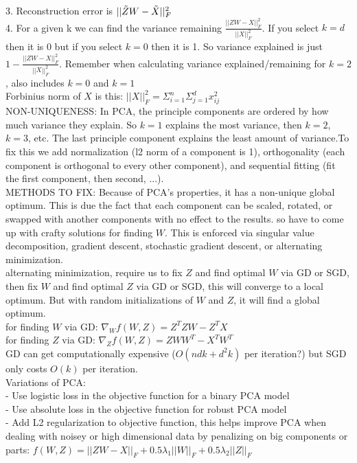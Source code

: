 \documentclass[8pt]{extarticle}
\begin{document}
\begin{multicols*}{2}
3. Reconstruction error is $||\Tilde{Z}W-\Tilde{X}||_F^2$ 
\\
4. For a given k we can find the variance remaining $\frac{||ZW-X||_F^2}{||X||_F^2}$. If you select $k=d$ then it is 0 but if you select $k=0$ then it is 1. So variance explained is just $1-\frac{||ZW-X||_F^2}{||X||_F^2}$. Remember when calculating variance explained/remaining for $k=2$, also includes $k=0$ and $k=1$
\\
Forbinius norm of $X$ is this: $||X||_F^2 = \Sigma_{i=1}^n \Sigma_{j=1}^d x_{ij}^2$
\\
NON-UNIQUENESS: In PCA, the principle components are ordered by how much variance they explain. So $k=1$ explains the most variance, then $k=2$, $k=3$, etc. The last principle component explains the least amount of variance.To fix this we add normalization (l2 norm of a component is 1), orthogonality (each component is orthogonal to every other component), and sequential fitting (fit the first component, then second, ...).
\\
METHODS TO FIX: Because of PCA's properties, it has a non-unique global optimum. This is due the fact that each component can be scaled, rotated, or swapped with another components with no effect to the results. so have to come up with crafty solutions for finding $W$. This is enforced via singular value decomposition, gradient descent, stochastic gradient descent, or alternating minimization.
\\
alternating minimization, require us to fix $Z$ and find optimal $W$ via GD or SGD, then fix $W$ and find optimal $Z$ via GD or SGD, this will converge to a local optimum. But with random initializations of $W$ and $Z$, it will find a global optimum.
\\
for finding $W$ via GD: $\nabla_Wf(W,Z)=Z^TZW-Z^TX$
\\
for finding $Z$ via GD: $\nabla_Zf(W,Z)=ZWW^T-X^TW^T$
\\
GD can get computationally expensive ($O(ndk+d^2k)$ per iteration?) but SGD only costs $O(k)$ per iteration.
\\
Variations of PCA: 
\\
- Use logistic loss in the objective function for a binary PCA model
\\
- Use absolute loss in the objective function for robust PCA model
\\
- Add L2 regularization to objective function, this helps improve PCA when dealing with noisey or high dimensional data by penalizing on big components or parts: $f(W,Z) = ||ZW - X||_F + 0.5\lambda_1||W||_F+0.5\lambda_2||Z||_F$

\end{multicols*}
\end{document}

